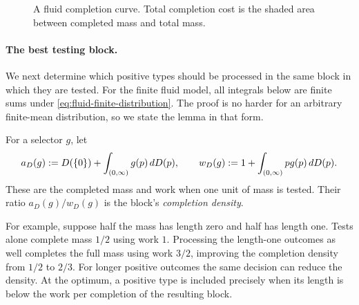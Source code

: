 \begin{figure}[htbp]
\centering
{}
\caption{A fluid completion curve.  Total completion cost is the shaded
area between completed mass and total mass.}
\label{fig:fluid-completion-curve}
\end{figure}

\paragraph{The best testing block.}

We next determine which positive types should be processed in the same block
in which they are tested.  For the finite fluid model, all integrals below
are finite sums under \cref{eq:fluid-finite-distribution}.  The proof is no
harder for an arbitrary finite-mean distribution, so we state the lemma in
that form.

For a selector $g$, let
\begin{equation}
 a_D(g)\mathrel{:=} D(\{0\})+\int_{(0,\infty)}g(p)\,dD(p),
 \qquad
 w_D(g)\mathrel{:=} 1+\int_{(0,\infty)}p g(p)\,dD(p).
 \label{eq:common-module-aw}
\end{equation}
These are the completed mass and work when one unit of mass is tested.
Their ratio $a_D(g)/w_D(g)$ is the block's \emph{completion density}.

For example, suppose half the mass has length zero and half has length one.
Tests alone complete mass $1/2$ using work $1$.  Processing the length-one
outcomes as well completes the full mass using work $3/2$, improving the
completion density from $1/2$ to $2/3$.  For longer positive outcomes the
same decision can reduce the density.  At the optimum, a positive type is
included precisely when its length is below the work per completion of the
resulting block.

